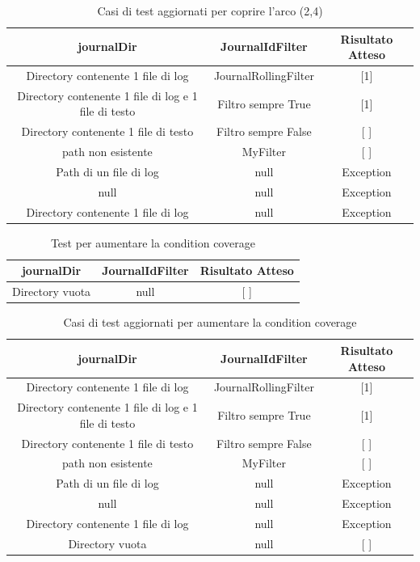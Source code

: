 \documentclass[12pt, a4paper]{article}
\begin{document}
\begin{table}[ht]
  \centering
  \caption[Journal: Test Suite - Adequacy Control Flow 2]{Casi di test aggiornati per coprire l'arco (2,4)}
  \begin{tabular}{|c|c|c|}
  \hline
  journalDir & JournalIdFilter & Risultato Atteso \\
  \hline
  {Directory contenente 1 file di log} & JournalRollingFilter & [1] \\
  {Directory contenente 1 file di log e 1 file di testo} & Filtro sempre True & [1] \\
  {Directory contenente 1 file di testo} & Filtro sempre False & [ ] \\
  {path non esistente} & MyFilter & [ ] \\
  {Path di un file di log} & null & Exception \\
  null & null & Exception \\
  {Directory contenente 1 file di log} & null & Exception \\
  \hline
  \end{tabular}
  \label{tab:ACF2ListJournalIds}
\end{table}

\begin{table}[ht]
  \centering
  \caption[Journal: Test Suite - Adequacy Control Flow 3]{Test per aumentare la condition coverage}
  \begin{tabular}{|c|c|c|}
    \hline
    journalDir & JournalIdFilter & Risultato Atteso \\
    \hline
    {Directory vuota} & null & [ ] \\
    \hline
  \end{tabular}
  \label{tab:ACF3ListJournalIds}
\end{table}

\begin{table}[ht]
  \centering
  \caption[Journal: Test Suite - Adequacy Control Flow 4]{Casi di test aggiornati per aumentare la condition coverage}
  \begin{tabular}{|c|c|c|}
  \hline
  journalDir & JournalIdFilter & Risultato Atteso \\
  \hline
  {Directory contenente 1 file di log} & JournalRollingFilter & [1] \\
  {Directory contenente 1 file di log e 1 file di testo} & Filtro sempre True & [1] \\
  {Directory contenente 1 file di testo} & Filtro sempre False & [ ] \\
  {path non esistente} & MyFilter & [ ] \\
  {Path di un file di log} & null & Exception \\
  null & null & Exception \\
  {Directory contenente 1 file di log} & null & Exception \\
  {Directory vuota} & null & [ ] \\
  \hline
  \end{tabular}
  \label{tab:ACF4ListJournalIds}
\end{table}
\end{document}
